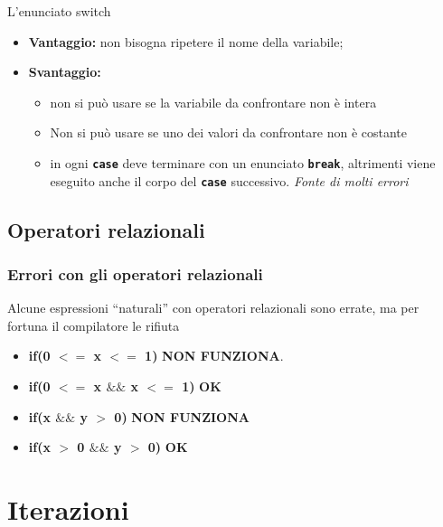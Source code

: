 \begin{frame}
\begin{block}{L'enunciato switch}
\begin{itemize}
\item \textbf{Vantaggio:} non bisogna ripetere il nome della variabile;
\item \textbf{Svantaggio:}
\begin{itemize}
\item non si può usare se la variabile da confrontare non è intera
\item Non si può usare se uno dei valori da confrontare non è costante
\item in ogni \textbf{\texttt{case}} deve terminare con un enunciato \textbf{\texttt{break}}, altrimenti viene eseguito anche il corpo
del \textbf{\texttt{case}} successivo. \textit{Fonte di molti errori}
\end{itemize}
\end{itemize}
\end{block}
\end{frame}

\subsection*{Operatori relazionali}
\begin{frame}
\frametitle{Errori con gli operatori relazionali}
\begin{block}{}
Alcune espressioni ``naturali'' con operatori relazionali sono errate, ma per fortuna il compilatore le rifiuta
\begin{itemize}
\item \textbf{if(0 \alert{$<=$} x \alert{$<=$} 1)} \textbf{\alert{NON FUNZIONA}}.
\item \textbf{if(0 $<=$ x $\&\&$ x $<=$ 1)} \textbf{OK}
\item \textbf{if(x \alert{$\&\&$} y $>$ 0)} \textbf{\alert{NON FUNZIONA}}
\item \textbf{if(x $>$ 0 \alert{$\&\&$} y $>$ 0)} \textbf{OK}
\end{itemize}
\end{block}
\end{frame}

\section*{Iterazioni}
